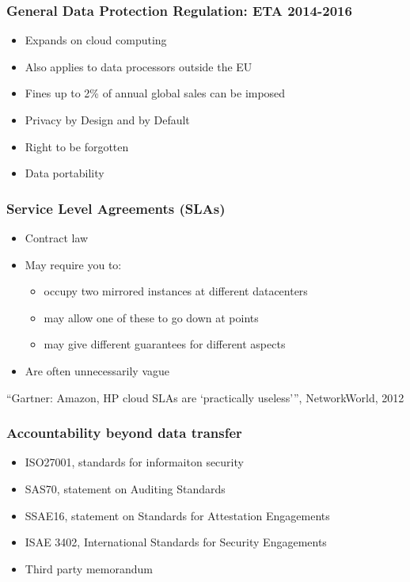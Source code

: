 \documentclass{beamer}
\begin{document}
\begin{frame}
    \frametitle{General Data Protection Regulation: ETA 2014-2016}
    \begin{itemize}
    \item Expands on cloud computing
    \item Also applies to data processors outside the EU
    \item Fines up to 2\% of annual global sales can be imposed
    \end{itemize}

    \begin{itemize}
    \item Privacy by Design and by Default
    \item Right to be forgotten
    \item Data portability
    \end{itemize}
\end{frame}

\begin{frame}
    \frametitle{Service Level Agreements (SLAs)}
    \begin{itemize}
    \item Contract law
    \item May require you to:
      \begin{itemize} %
        \item occupy two mirrored instances at different datacenters
        \item may allow one of these to go down at points
        \item may give different guarantees for different aspects
      \end{itemize}
    \item Are often unnecessarily vague
    \end{itemize}
    \footnotesize{``Gartner: Amazon, HP cloud SLAs are `practically useless''', NetworkWorld, 2012}
\end{frame}

\begin{frame}
    \frametitle{Accountability beyond data transfer}
    \begin{itemize}
    \item ISO27001, standards for informaiton security
    \item SAS70, statement on Auditing Standards
    \item SSAE16, statement on Standards for Attestation Engagements
    \item ISAE 3402, International Standards for Security Engagements
    \item Third party memorandum 
    \end{itemize}
\end{frame}
\end{document}
